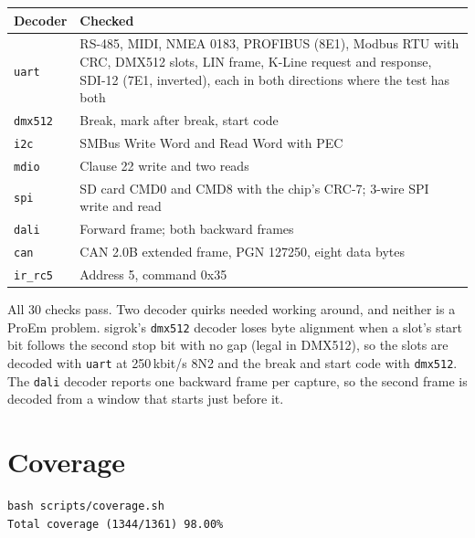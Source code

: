 \documentclass[11pt,a4paper]{article}
\newcommand{\sig}[1]{\texttt{#1}}
\begin{document}
\begin{center}
\begin{tabularx}{\linewidth}{@{}l L@{}}
\toprule
Decoder & Checked \\
\midrule
\sig{uart} & RS-485, MIDI, NMEA 0183, PROFIBUS (8E1), Modbus RTU with CRC, DMX512 slots, LIN frame, K-Line request and response, SDI-12 (7E1, inverted), each in both directions where the test has both \\
\sig{dmx512} & Break, mark after break, start code \\
\sig{i2c} & SMBus Write Word and Read Word with PEC \\
\sig{mdio} & Clause 22 write and two reads \\
\sig{spi} & SD card CMD0 and CMD8 with the chip's CRC-7; 3-wire SPI write and read \\
\sig{dali} & Forward frame; both backward frames \\
\sig{can} & CAN 2.0B extended frame, PGN 127250, eight data bytes \\
\sig{ir\_rc5} & Address 5, command 0x35 \\
\bottomrule
\end{tabularx}
\end{center}

All 30 checks pass. Two decoder quirks needed working around, and neither is a ProEm problem. sigrok's \sig{dmx512} decoder loses byte alignment when a slot's start bit follows the second stop bit with no gap (legal in DMX512), so the slots are decoded with \sig{uart} at 250\,kbit/s 8N2 and the break and start code with \sig{dmx512}. The \sig{dali} decoder reports one backward frame per capture, so the second frame is decoded from a window that starts just before it.

\section{Coverage}

\begin{lstlisting}
bash scripts/coverage.sh
Total coverage (1344/1361) 98.00%
\end{lstlisting}
\end{document}
